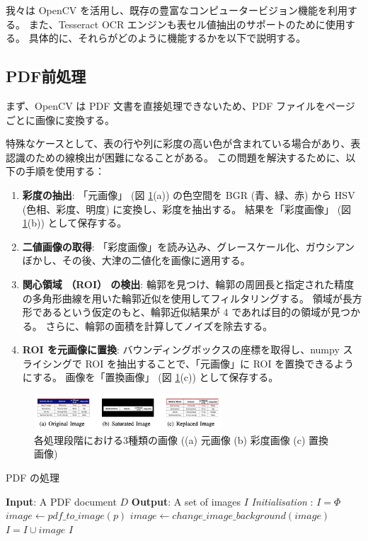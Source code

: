 \documentclass[uplatex, twocolumn,10pt]{jsarticle}
\begin{document}
我々は OpenCV を活用し、既存の豊富なコンピュータービジョン機能を利用する。
また、Tesseract OCR エンジンも表セル値抽出のサポートのために使用する。
具体的に、それらがどのように機能するかを以下で説明する。

\subsection{PDF前処理}
まず、OpenCV は PDF 文書を直接処理できないため、PDF ファイルをページごとに画像に変換する。

特殊なケースとして、表の行や列に彩度の高い色が含まれている場合があり、表認識のための線検出が困難になることがある。
この問題を解決するために、以下の手順を使用する：

\begin{enumerate}
    \item \textbf{彩度の抽出}:
    「元画像」 (図 \ref{fig2}(a)) の色空間を BGR (青、緑、赤) から HSV (色相、彩度、明度) に変換し、彩度を抽出する。
    結果を「彩度画像」 (図 \ref{fig2}(b)) として保存する。
    \item \textbf{二値画像の取得}:
    「彩度画像」を読み込み、グレースケール化、ガウシアンぼかし、その後、大津の二値化を画像に適用する。
    \item \textbf{関心領域 （ROI） の検出}:
    輪郭を見つけ、輪郭の周囲長と指定された精度の多角形曲線を用いた輪郭近似を使用してフィルタリングする。
    領域が長方形であるという仮定のもと、輪郭近似結果が 4 であれば目的の領域が見つかる。
    さらに、輪郭の面積を計算してノイズを除去する。
    \item \textbf{ROI を元画像に置換}:
    バウンディングボックスの座標を取得し、numpy スライシングで ROI を抽出することで、「元画像」に ROI を置換できるようにする。
    画像を「置換画像」 (図 \ref{fig2}(c)) として保存する。
\end{enumerate}

\begin{figure}[tp]
    \begin{center}
        \includegraphics*[width=7cm]{image/master/master2/Fig2.png}
        \caption{各処理段階における3種類の画像 ((a) 元画像 (b) 彩度画像 (c) 置換画像)}
        \label{fig2}
    \end{center}
\end{figure}


\begin{algorithm}
    \caption{PDF の処理}
    \begin{algorithmic}
    \STATE \textbf{Input}: A PDF document $D$
    \STATE \textbf{Output}: A set of images $I$
    \STATE \textit{Initialisation} : $I = \Phi$
        \STATE $image \leftarrow pdf\_to\_image(p)$
            \STATE $image \leftarrow change\_image\_background(image)$
        \ENDIF
        \STATE $I = I \cup image$
    \ENDFOR
    \RETURN $I$
    \end{algorithmic}
\end{algorithm}
\end{document}
